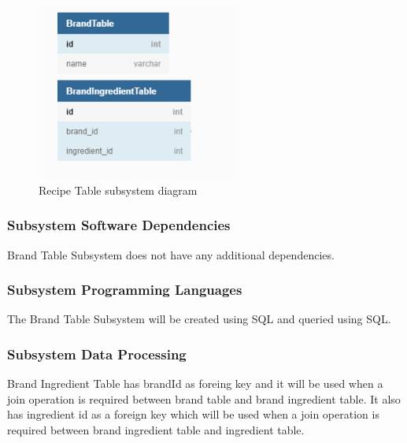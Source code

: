 \begin{figure}[h!]
	\centering
 	\includegraphics[width=0.60\textwidth]{images/Brand_Table.png}
 \caption{Recipe Table subsystem diagram}
\end{figure}

\subsubsection{Subsystem Software Dependencies}
Brand Table Subsystem does not have any additional dependencies.

\subsubsection{Subsystem Programming Languages}
The Brand Table Subsystem will be created using SQL and queried using SQL.

\subsubsection{Subsystem Data Processing}
Brand Ingredient Table has brandId as foreing key and it will be used when a join operation is required between brand table and brand ingredient table. It also has ingredient id as a foreign key which will be used when a join operation is required between brand ingredient table and ingredient table.
